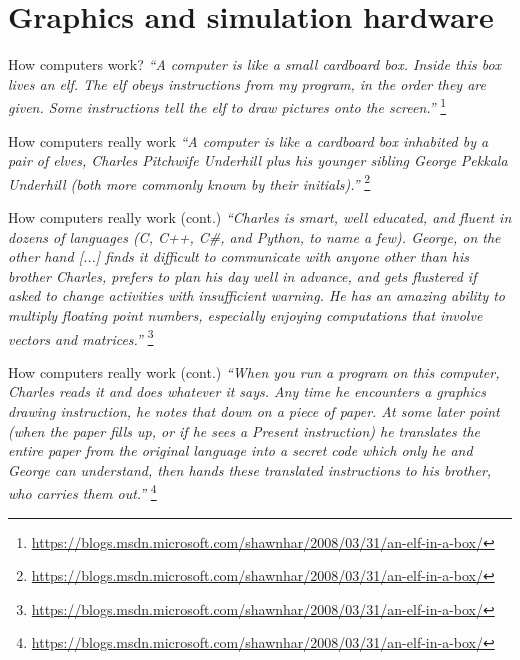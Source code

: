 \newcommand\blfootnote[1]{%
  \begingroup
  \renewcommand\thefootnote{}\footnote{#1}%
  \addtocounter{footnote}{-1}%
  \endgroup
}

\part{Graphics and simulation hardware}
\frame{\partpage}

\begin{frame}{How computers work?}
		\textit{``A computer is like a small cardboard box. Inside this box lives an elf.
		The elf obeys instructions from my program, in the order they are given.
		Some instructions tell the elf to draw pictures onto the screen.''}
	\blfootnote{\url{https://blogs.msdn.microsoft.com/shawnhar/2008/03/31/an-elf-in-a-box/}}
\end{frame}

\begin{frame}{How computers really work}
		\textit{``A computer is like a cardboard box inhabited by a pair of elves,
		Charles Pitchwife Underhill plus his younger sibling George Pekkala Underhill 
		(both more commonly known by their initials).''}
	\blfootnote{\url{https://blogs.msdn.microsoft.com/shawnhar/2008/03/31/an-elf-in-a-box/}}
\end{frame}

\begin{frame}{How computers really work (cont.)}
		\textit{``Charles is smart, well educated, and fluent in dozens of languages 
		(C, C++, C\#, and Python, to name a few).
		George, on the other hand [...]
		finds it difficult to communicate with anyone other than his brother Charles, 
		prefers to plan his day well in advance, and gets flustered if asked to change 
		activities with insufficient warning. He has an amazing ability to multiply 
		floating point numbers, especially enjoying computations that involve vectors 
		and matrices.''}
	\blfootnote{\url{https://blogs.msdn.microsoft.com/shawnhar/2008/03/31/an-elf-in-a-box/}}
\end{frame}

\begin{frame}{How computers really work (cont.)}
		\textit{``When you run a program on this computer, Charles reads it and does whatever it says. 
		Any time he encounters a graphics drawing instruction, he notes that down on a piece of paper. 
		At some later point (when the paper fills up, or if he sees a Present instruction) 
		he translates the entire paper from the original language into a secret code which 
		only he and George can understand, then hands these translated instructions to his brother, 
		who carries them out.''}
	\blfootnote{\url{https://blogs.msdn.microsoft.com/shawnhar/2008/03/31/an-elf-in-a-box/}}
\end{frame}

